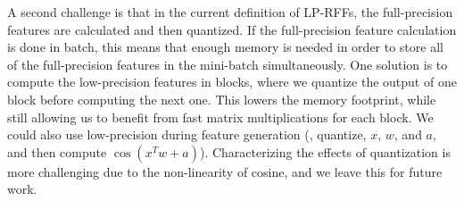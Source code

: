 A second challenge is that in the current definition of LP-RFFs, the full-precision features are calculated and then quantized. If the full-precision feature calculation is done in batch, this means that enough memory is needed in order to store all of the full-precision features in the mini-batch simultaneously. One solution is to compute the low-precision features in blocks, where we quantize the output of one block before computing the next one. This lowers the memory footprint, while still allowing us to benefit from fast matrix multiplications for each block. We could also use low-precision during feature generation (\ie, quantize, $x$, $w$, and $a$, and then compute $\cos(x^T w + a)$).  Characterizing the effects of quantization is more challenging due to the non-linearity of cosine, and we leave this for future work.
